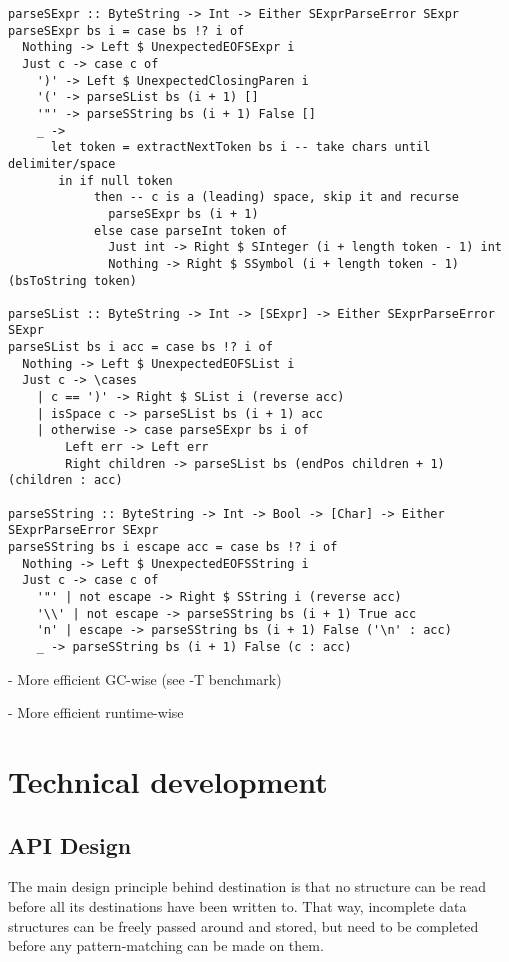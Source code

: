 \documentclass[english]{jflart}
\begin{document}
\begin{verbatim}
parseSExpr :: ByteString -> Int -> Either SExprParseError SExpr
parseSExpr bs i = case bs !? i of
  Nothing -> Left $ UnexpectedEOFSExpr i
  Just c -> case c of
    ')' -> Left $ UnexpectedClosingParen i
    '(' -> parseSList bs (i + 1) []
    '"' -> parseSString bs (i + 1) False []
    _ ->
      let token = extractNextToken bs i -- take chars until delimiter/space
       in if null token
            then -- c is a (leading) space, skip it and recurse
              parseSExpr bs (i + 1)
            else case parseInt token of
              Just int -> Right $ SInteger (i + length token - 1) int
              Nothing -> Right $ SSymbol (i + length token - 1) (bsToString token)

parseSList :: ByteString -> Int -> [SExpr] -> Either SExprParseError SExpr
parseSList bs i acc = case bs !? i of
  Nothing -> Left $ UnexpectedEOFSList i
  Just c -> \cases
    | c == ')' -> Right $ SList i (reverse acc)
    | isSpace c -> parseSList bs (i + 1) acc
    | otherwise -> case parseSExpr bs i of
        Left err -> Left err
        Right children -> parseSList bs (endPos children + 1) (children : acc)

parseSString :: ByteString -> Int -> Bool -> [Char] -> Either SExprParseError SExpr
parseSString bs i escape acc = case bs !? i of
  Nothing -> Left $ UnexpectedEOFSString i
  Just c -> case c of
    '"' | not escape -> Right $ SString i (reverse acc)
    '\\' | not escape -> parseSString bs (i + 1) True acc
    'n' | escape -> parseSString bs (i + 1) False ('\n' : acc)
    _ -> parseSString bs (i + 1) False (c : acc)
\end{verbatim}

- More efficient GC-wise (see -T benchmark)

- More efficient runtime-wise

\section{Technical development}

\subsection{API Design}

The main design principle behind destination is that no structure can be read before all its destinations have been written to. That way, incomplete data structures can be freely passed around and stored, but need to be completed before any pattern-matching can be made on them.
\end{document}
